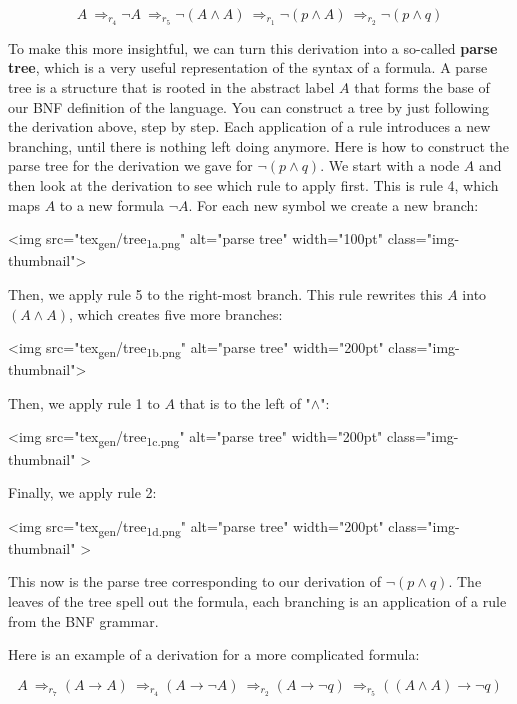 \documentclass[11pt]{article}
\begin{document}
$$A\ \Longrightarrow_{r_4} \neg A\ \Longrightarrow_{r_5} \neg (A\land A)\ \Longrightarrow_{r_1}\neg(p\land A)\ \Longrightarrow_{r_2}\neg(p\land q)$$

To make this more insightful, we can turn this derivation into a so-called \textbf{\textbf{parse tree}}, which is a very useful representation of the syntax of a formula. A parse tree is a structure that is rooted in the abstract label \(A\) that forms the base of our BNF definition of the language. You can construct a tree by just following the derivation above, step by step. Each application of a rule introduces a new branching, until there is nothing left doing anymore. Here is how to construct the parse tree for the derivation we gave for \(\neg(p\land q)\). We start with a node \(A\) and then look at the derivation to see which rule to apply first. This is rule 4, which maps \(A\) to a new formula \(\neg A\). For each new symbol we create a new branch:

<img src="tex\textsubscript{gen}/tree\textsubscript{1}\textsubscript{a.png}" alt="parse tree" width="100pt" class="img-thumbnail"> 

Then, we apply rule 5 to the right-most branch. This rule rewrites this \(A\) into \((A\land A)\), which creates five more branches:

<img src="tex\textsubscript{gen}/tree\textsubscript{1}\textsubscript{b.png}" alt="parse tree" width="200pt" class="img-thumbnail"> 

Then, we apply rule 1 to \(A\) that is to the left of "\(\land\)":

<img src="tex\textsubscript{gen}/tree\textsubscript{1}\textsubscript{c.png}" alt="parse tree" width="200pt" class="img-thumbnail" >

Finally, we apply rule 2:

<img src="tex\textsubscript{gen}/tree\textsubscript{1}\textsubscript{d.png}" alt="parse tree" width="200pt" class="img-thumbnail" >

This now is the parse tree corresponding to our derivation of \(\neg(p\land q)\). The leaves of the tree spell out the formula, each branching is an application of a rule from the BNF grammar.

Here is an example of a derivation for a more complicated formula:

$$A\ \Longrightarrow_{r_7} (A\rightarrow A)\ \Longrightarrow_{r_4} (A\rightarrow \neg A)\ \Longrightarrow_{r_2} (A\rightarrow \neg q)\ \Longrightarrow_{r_5} ((A\land A)\rightarrow \neg q)$$ 
\end{document}
